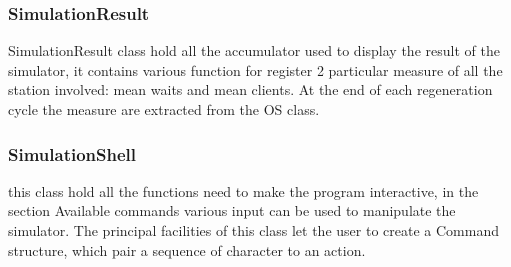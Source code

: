\documentclass[12pt,a4paper]{article}
\begin{document}
\subsubsection{SimulationResult}
SimulationResult class hold all the accumulator used to display the result of the simulator, it contains various function for register 2 particular measure of all the station involved: mean waits and mean clients. At the end of each regeneration cycle the measure are extracted from the OS class.
\subsubsection{SimulationShell}
this class hold all the functions need to make the program interactive, in the section Available commands various input can be used to manipulate the simulator. The principal facilities of this class let the user to create a Command structure, which pair a sequence of character to an action.
\end{document}
